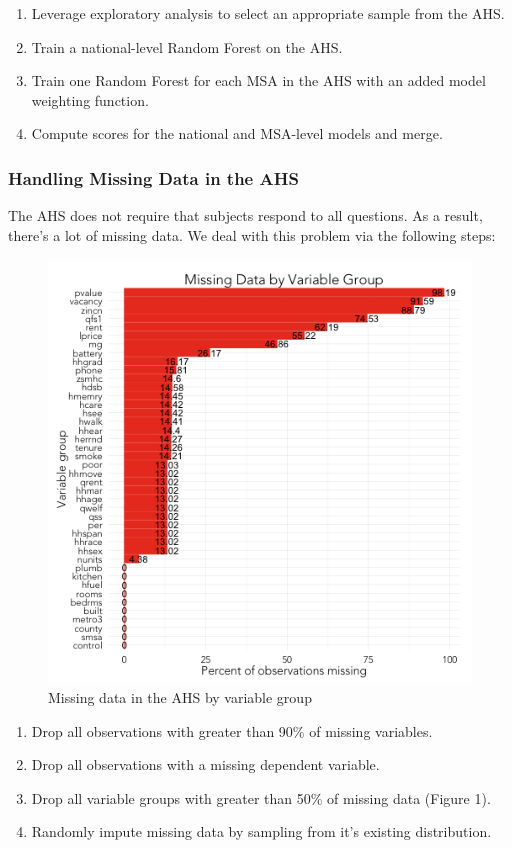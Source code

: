 \documentclass{sig-alternate}
\begin{document}
\begin{enumerate} 
\item Leverage exploratory analysis to select an appropriate sample from the AHS.
\item Train a national-level Random Forest on the AHS.
\item Train one Random Forest for each MSA in the AHS with an added model weighting function.
\item Compute scores for the national and MSA-level models and merge.
\end{enumerate}

\subsubsection{Handling Missing Data in the AHS}

The AHS does not require that subjects respond to all questions. As a result, there's a lot of missing data. We deal with this problem via the following steps:

\begin{figure}
\centering 
\includegraphics[scale=0.42]{missing-data-1.png}
\caption{Missing data in the AHS by variable group}
\end{figure}

\begin{enumerate} 
\item Drop all observations with greater than 90\% of missing variables. 
\item Drop all observations with a missing dependent variable.
\item Drop all variable groups with greater than 50\% of missing data (Figure 1).
\item Randomly impute missing data by sampling from it's existing distribution.
\end{enumerate}
\end{document}
